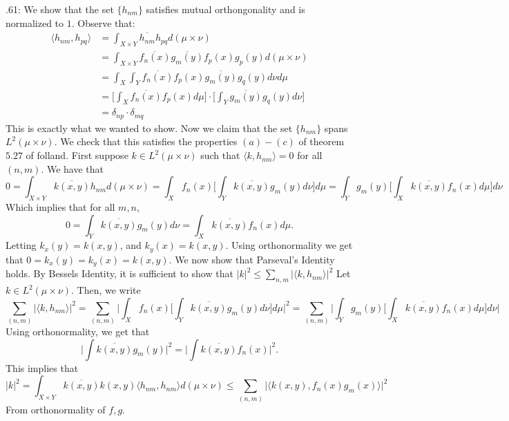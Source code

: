 \documentclass[letterpaper]{article}
\newcommand{\lan}{\langle}
\newcommand{\ran}{\rangle}
\newcommand{\inn}[1]{\lan#1\ran}
\newcommand{\ol}{\overline}
\begin{document}
 .61: 
We show that the set $\{h_{nm}\}$ satisfies mutual orthongonality and is normalized to $1$. Observe that: 
\begin{align*} \inn{h_{nm}, h_{pq}} & = \int_{X \times Y} \ol{h_{nm}} h_{pq}  d(\mu \times \nu)
    \\ & = \int_{X \times Y} \ol{f_n(x)} \ol{g_m(y)}f_p(x)g_p(y) d(\mu \times \nu)
    \\ & = \int_{X} \int_Y \ol{f_n(x)}f_p(x)\ol{g_m(y)}g_q(y) d\nu d\mu \tag{by Fubini-Tonelli's Theorem}
    \\ & = \Big[\int_{X} \ol{f_n(x)}f_p(x) d\mu \Big] \cdot \Big[ \int_Y \ol{g_m(y)}g_q(y) d\nu\Big]
    \\ & = \delta_{np} \cdot \delta_{mq} \tag{Since $f_i,g_j$ form orthonormal basis}
\end{align*}
This is exactly what we wanted to show. Now we claim that the set $\{h_{nm}\}$ spans $L^2(\mu \times \nu)$.
We check that this satisfies the properties $(a)-(c)$ of theorem $5.27$ of folland. First suppose 
$k\in L^2(\mu \times \nu)$ such that $\inn{k, h_{nm}} =0$ for all $(n,m)$. We have that 
$$ 0= \int_{X \times Y} \ol{k(x,y)} h_{nm} d(\mu \times \nu) = \int_X f_n(x)\Big[ \int_Y \ol{k(x,y)} g_m(y) d\nu \Big]d\mu = \int_Y g_m(y) \Big[ \int_X \ol{k(x,y)} f_n(x) d\mu \Big] d\nu$$
Which implies that for all $m,n$, 
$$ 0 = \int_{Y} \ol{k(x,y)} g_{m}(y) d\nu = \int_X \ol{k(x,y)} f_n(x) d\mu.$$ Letting $k_x(y) = k(x,y)$, and $k_y(x) = k(x,y)$. Using orthonormality we get that $0= k_x(y)=k_y(x) = k(x,y)$. 
We now show that Parseval's Identity holds. By Bessels Identity, it is sufficient to show that $|k|^2 \leq \sum_{n,m} |\inn{k,h_{nm}}|^2$ Let $k\in L^2(\mu \times \nu)$. 
Then, we write $$\sum_{(n,m)} \Big| \inn{k, h_{nm}} \Big|^2 =\sum_{(n,m)} \Big| \int_X f_n(x) \Big[\int_Y \ol{k(x,y)}g_m(y) d\nu \Big] d\mu \Big|^2 = \sum_{(n,m)} \Big| \int_Y g_m(y) \Big[ \int_X \ol{k(x,y)}f_n(x) d\mu\Big] d\nu \Big| $$
Using orthonormality, we get that $$ \Big|\int \ol{k(x,y)} g_m(y) \Big|^2 = \Big|\int \ol{k(x,y)} f_n(x)\Big|^2.$$ 
This implies that $$|k|^2 = \int_{X \times Y} \ol{k(x,y)}k(x,y)\inn{h_{nm}, h_{nm}} d(\mu \times \nu) \leq \sum_{(n,m)} \Big| \inn{k(x,y) , f_n(x)g_m(x)} \Big|^2 $$
From orthonormality of $f,g$. 
\end{document}
